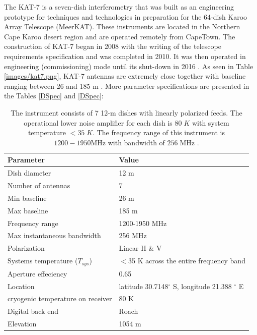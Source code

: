 The KAT-7 is a seven-dish interferometry that was built as an engineering prototype for  techniques and technologies in preparation for the 64-dish Karoo Array Telescope (MeerKAT). These instruments are located in the Northern Cape Karoo desert region and are operated remotely from CapeTown. The construction of  KAT-7 began in
2008 with the writing of the telescope requirements specification and was completed in 2010.  It was then operated in engineering (commissioning) mode until its shut-down in 2016 \citep{foley2016engineering}. As seen in Table \ref{images/kat7.png}, KAT-7 antennas are extremely close together with baseline ranging between 26 and 185 m \citep{carignan2013kat}. More parameter specifications are presented in the Tables \ref{DSpec} and \ref{DSpec}:
\begin{table}[H]\centering
\begin{tabular}{l l }
\toprule
\textbf{Parameter} & \textbf{Value}\\
\midrule
Dish diameter&12 m \\
Number of antennas& 7\\
Min baseline & 26 m\\
Max baseline & 185 m\\
Frequency range & 1200-1950 MHz\\
Max instantaneous bandwidth &256 MHz\\
Polarization   & Linear H $\&$ V\\
Systems temperature ($T_{sys}$) & $<$35 K across the entire frequency band\\
Aperture effeciency & 0.65\\
Location &  latitude 30.7148$^{\circ}$ S, longitude 21.388 $^{\circ}$ E\\
cryogenic temperature on receiver & 80 K\\
Digital back end & Roach \\
Elevation & 1054 m\\
\bottomrule
\end{tabular}
\caption{The instrument consists of 7 12-m dishes with linearly polarized feeds. The operational lower noise amplifier for each dish is $80\;K$  with system temperature $<35\;K$. The frequency range of this instrument is $1200-1950 \text{MHz}$ with bandwidth of $256\;\text{MHz}$ \citep{foley2016engineering}.}
\label{K7 spec}
\end{table}

